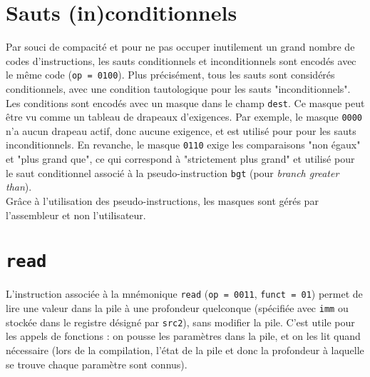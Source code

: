 \section{Sauts (in)conditionnels}

Par souci de compacité et pour ne pas occuper inutilement un grand nombre de
codes d'instructions, les sauts conditionnels et inconditionnels sont encodés
avec le même code (\texttt{op = 0100}). Plus précisément, tous les sauts sont
considérés conditionnels, avec une condition tautologique pour les sauts
"inconditionnels". \\

Les conditions sont encodés avec un masque\cite{bit_mask} dans le champ
\texttt{dest}. Ce masque peut être vu comme un tableau de drapeaux d'exigences.
Par exemple, le masque \texttt{0000} n'a aucun drapeau actif, donc aucune
exigence, et est utilisé pour pour les sauts inconditionnels. En revanche, le
masque \texttt{0110} exige les comparaisons "non égaux" et "plus grand que", ce
qui correspond à "strictement plus grand" et utilisé pour le saut conditionnel
associé à la pseudo-instruction \texttt{bgt} (pour \textit{branch greater
than}). \\

Grâce à l'utilisation des pseudo-instructions, les masques sont gérés par
l'assembleur et non l'utilisateur.

\section{\texttt{read}}

L'instruction associée à la mnémonique \texttt{read} (\texttt{op = 0011},
\texttt{funct = 01}) permet de lire une valeur dans la pile à une profondeur
quelconque (spécifiée avec \texttt{imm} ou stockée dans le registre désigné par
\texttt{src2}), sans modifier la pile. C'est utile pour les appels de
fonctions : on pousse les paramètres dans la pile, et on les lit quand
nécessaire (lors de la compilation, l'état de la pile et donc la
profondeur à laquelle se trouve chaque paramètre sont connus).
